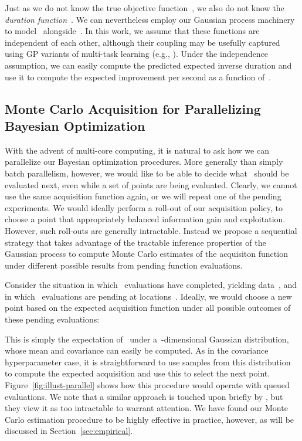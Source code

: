 \documentclass[aos,preprint]{imsart}
\begin{document}
Just as we do not know the true objective function~, we also
do not know the \emph{duration
  function}~.  We can nevertheless
employ our Gaussian process machinery to model~
alongside~.  In this work, we assume that these functions
are independent of each other, although their coupling may be usefully
captured using GP variants of multi-task learning (e.g., \citet{teh-etal-2005a,bonilla-etal-2008a}).
Under the independence assumption, we can easily compute the predicted
expected inverse duration and use it to compute the expected
improvement per second as a function of~.

\subsection{Monte Carlo Acquisition for Parallelizing Bayesian Optimization}
With the advent of multi-core computing, it is natural to ask how we
can parallelize our Bayesian optimization procedures.  More generally
than simply batch parallelism, however, we would like to be able to
decide what~ should be evaluated next, even while a set of
points are being evaluated.  Clearly, we cannot use the same
acquisition function again, or we will repeat one of the pending
experiments.  We would ideally perform a roll-out of our acquisition
policy, to choose a point that appropriately balanced information gain
and exploitation.  However, such roll-outs are generally intractable.
Instead we propose a sequential strategy that takes advantage of the
tractable inference properties of the Gaussian process to compute
Monte Carlo estimates of the acquisiton function under different
possible results from pending function evaluations.

Consider the situation in which~ evaluations have completed,
yielding data~, and in which~ evaluations
are pending at locations~.  Ideally, we would
choose a new point based on the expected acquisition function under
all possible outcomes of these pending evaluations:

This is simply the expectation of~ under a~-dimensional
Gaussian distribution, whose mean and covariance can easily be
computed.  As in the covariance hyperparameter case, it is
straightforward to use samples from this distribution to compute the
expected acquisition and use this to select the next point.
Figure~\ref{fig:illust-parallel} shows how this procedure would
operate with queued evaluations.  We note that a similar approach is
touched upon briefly by \citet{Ginsbourger2010a}, but they view it as
too intractable to warrant attention.  We have found our Monte Carlo
estimation procedure to be highly effective in practice, however, as
will be discussed in Section~\ref{sec:empirical}.
\end{document}
